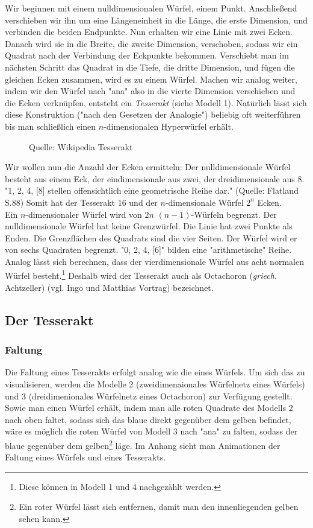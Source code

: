 Wir beginnen mit einem nulldimensionalen Würfel, einem Punkt.
Anschließend verschieben wir ihn um eine Längeneinheit in die Länge, die erste Dimension, und verbinden die beiden Endpunkte. Nun erhalten wir eine Linie mit zwei Ecken. 
Danach wird sie in die Breite, die zweite Dimension, verschoben, sodass wir ein Quadrat nach der Verbindung der Eckpunkte bekommen. Verschiebt man im nächsten Schritt das Quadrat in die Tiefe, die dritte Dimension, und fügen die gleichen Ecken zusammen, wird es zu einem Würfel. Machen wir analog weiter, indem wir den Würfel nach "ana" also in die vierte Dimension verschieben und die Ecken verknüpfen,  entsteht ein \emph{Tesserakt} (siehe Modell 1). Natürlich lässt sich diese Konstruktion ("nach den Gesetzen der Analogie") beliebig oft weiterführen bis man schließlich einen $n$-dimensionalen Hyperwürfel erhält. 
\begin{figure}[h]
\centering

\caption{Quelle: Wikipedia Tesserakt}
\label{Wuerfel}
\end{figure}

\indent Wir wollen nun die Anzahl der Ecken ermitteln: Der nulldimensionale Würfel besteht aus einem Eck, der eindimensionale aus zwei, der dreidimensionale aus 8. "1, 2, 4, [8] stellen offensichtlich eine geometrische Reihe dar." (Quelle: Flatland S.88) Somit hat der Tesserakt 16 und der $n$-dimensionale Würfel $2^n$ Ecken. 
\\ \indent Ein $n$-dimensionaler Würfel wird von $2n$ $(n-1)$-Würfeln begrenzt. Der nulldimensionale Würfel hat keine Grenzwürfel. Die Linie hat zwei Punkte als Enden. Die Grenzflächen des Quadrats sind die vier Seiten. Der Würfel wird er von sechs Quadraten begrenzt. "0, 2, 4, [6]" bilden eine "arithmetische" Reihe. Analog lässt sich berechnen, dass der vierdimensionale Würfel aus acht normalen Würfel besteht.\footnote{Diese können in Modell 1 und 4 nachgezählt werden.} Deshalb wird der Tesserakt auch als Octachoron (\textit{griech.} Achtzeller) (vgl. Ingo und Matthias Vortrag) bezeichnet.



\subsection*{Der Tesserakt}
	\subsubsection*{Faltung}
		 Die Faltung eines Tesserakts erfolgt analog wie die eines Würfels. Um sich das zu visualisieren, werden die Modelle 2 (zweidimenaionales Würfelnetz eines Würfels) und 3 (dreidimenionales Würfelnetz eines Octachoron) zur Verfügung gestellt. Sowie man einen Würfel erhält, indem man alle roten Quadrate des Modells 2 nach oben faltet, sodass sich das blaue direkt gegenüber dem gelben befindet, wäre es möglich die roten Würfel von Modell 3 nach "ana" zu falten, sodass der blaue gegenüber dem gelben\footnote{Ein roter Würfel lässt sich entfernen, damit man den innenliegenden gelben sehen kann.} läge. Im Anhang sieht man Animationen der Faltung eines Würfels und eines Tesserakts.

